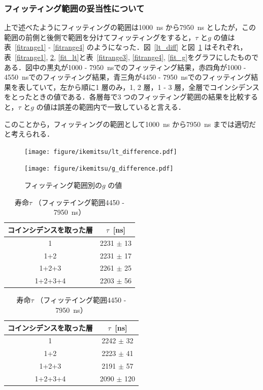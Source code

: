 \subsubsection{フィッティング範囲の妥当性について}
上で述べたようにフィッティングの範囲は1000~ns から7950~ns としたが，この範囲の前側と後側で範囲を分けてフィッティングをすると，$\tau$ と$g$ の値は表~\ref{fitrange1} - \ref{fitrange4} のようになった．図~\ref{lt_diff} と図~\ref{g_diff} はそれぞれ，表~\ref{fitrange1}, \ref{fitrange2}, \ref{fit_lt}と表~\ref{fitrange3}, \ref{fitrange4}, \ref{fit_g}をグラフにしたものである．図中の黒丸が1000 - 7950~nsでのフィッティング結果，赤四角が1000 - 4550~nsでのフィッティング結果，青三角が4450 - 7950~nsでのフィッティング結果を表していて，左から順に1 層のみ，1, 2 層，1 - 3 層，全層でコインシデンスをとったときの値である．各層毎で3 つのフィッティング範囲の結果を比較すると，$\tau$ と$g$ の値は誤差の範囲内で一致していると言える．
  
このことから，フィッティングの範囲として1000~ns から7950~ns までは適切だと考えられる．

\begin{figure}[H]
\centering
\begin{minipage}{0.4\columnwidth}
\centering
\texttt{[image: figure/ikemitsu/lt\_difference.pdf]}
\caption{フィッティング範囲別の寿命の値}
\label{lt_diff}
\end{minipage}
\begin{minipage}{0.4\columnwidth}
\centering
\texttt{[image: figure/ikemitsu/g\_difference.pdf]}
\caption{フィッティング範囲別の$g$ の値}
\label{g_diff}
\end{minipage}
\end{figure}
  
\begin{table}[H]
\centering
\begin{minipage}{0.4\columnwidth}
\caption{寿命$\tau$ （フィッティング範囲1000 - 4550~ns） }
\label{fitrange1}
\centering
\begin{tabular}{cc}\toprule
コインシデンスを取った層 & $\tau$~[ns] \\ \midrule
1       & 2231 $\pm$ 13 \\
1+2     & 2231 $\pm$ 17 \\
1+2+3   & 2261 $\pm$ 25 \\
1+2+3+4 & 2203 $\pm$ 56 \\ \bottomrule
\end{tabular}
\end{minipage}
\hspace*{5mm}
\begin{minipage}{0.4\columnwidth}
\caption{寿命$\tau$ （フィッテイング範囲4450 - 7950~ns） }
\label{fitrange2}
\centering
\begin{tabular}{cc}\toprule
コインシデンスを取った層 & $\tau$~[ns] \\ \midrule
1       & 2242 $\pm$ 32 \\
1+2     & 2223 $\pm$ 41 \\
1+2+3   & 2191 $\pm$ 57 \\
1+2+3+4 & 2090 $\pm$ 120 \\ \bottomrule
\end{tabular}
\end{minipage}
\end{table}%

